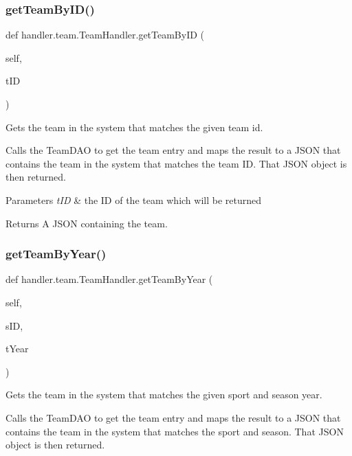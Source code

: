 \subsubsection{\texorpdfstring{get\+Team\+By\+I\+D()}{getTeamByID()}}
{\footnotesize\ttfamily def handler.\+team.\+Team\+Handler.\+get\+Team\+By\+ID (\begin{DoxyParamCaption}\item[{}]{self,  }\item[{}]{t\+ID }\end{DoxyParamCaption})}



Gets the team in the system that matches the given team id. 

Calls the Team\+D\+AO to get the team entry and maps the result to a J\+S\+ON that contains the team in the system that matches the team ID. That J\+S\+ON object is then returned.


\begin{DoxyParams}{Parameters}
{\em t\+ID} & the ID of the team which will be returned\\
\hline
\end{DoxyParams}
\begin{DoxyReturn}{Returns}
A J\+S\+ON containing the team. 
\end{DoxyReturn}
\mbox{\label{classhandler_1_1team_1_1_team_handler_a4ee11f08a2e69e4a250527c9fea26190}} 
\subsubsection{\texorpdfstring{get\+Team\+By\+Year()}{getTeamByYear()}}
{\footnotesize\ttfamily def handler.\+team.\+Team\+Handler.\+get\+Team\+By\+Year (\begin{DoxyParamCaption}\item[{}]{self,  }\item[{}]{s\+ID,  }\item[{}]{t\+Year }\end{DoxyParamCaption})}



Gets the team in the system that matches the given sport and season year. 

Calls the Team\+D\+AO to get the team entry and maps the result to a J\+S\+ON that contains the team in the system that matches the sport and season. That J\+S\+ON object is then returned.


